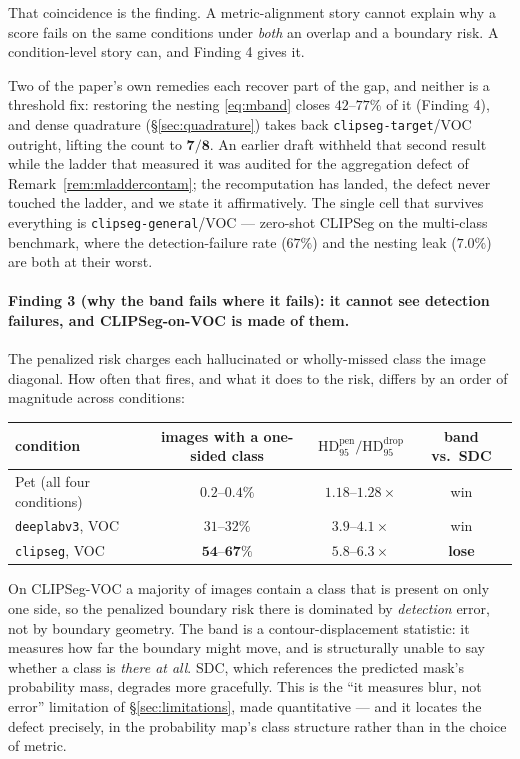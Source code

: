 \documentclass[11pt]{article}
\theoremstyle{remark}
\newcommand{\HDF}{\mathrm{HD}_{95}}
\begin{document}
That coincidence is the finding. A metric-alignment story cannot explain why a
score fails on the same conditions under \emph{both} an overlap and a boundary risk.
A condition-level story can, and Finding 4 gives it.

Two of the paper's own remedies each recover part of the gap, and neither is a
threshold fix: restoring the nesting \eqref{eq:mband} closes $42$--$77\%$ of it
(Finding 4), and dense quadrature (\S\ref{sec:quadrature}) takes back
\texttt{clipseg-target}/VOC outright, lifting the count to $\mathbf{7/8}$. An earlier
draft withheld that second result while the ladder that measured it was audited for the
aggregation defect of Remark~\ref{rem:mladdercontam}; the recomputation has landed, the
defect never touched the ladder, and we state it affirmatively. The single cell that
survives everything is
\texttt{clipseg-general}/VOC ---
zero-shot CLIPSeg on the multi-class benchmark, where the detection-failure rate
($67\%$) and the nesting leak ($7.0\%$) are both at their worst.

\paragraph{Finding 3 (why the band fails where it fails): it cannot see detection
failures, and CLIPSeg-on-VOC is made of them.} The penalized risk charges each
hallucinated or wholly-missed class the image diagonal. How often that fires, and
what it does to the risk, differs by an order of magnitude across conditions:

\begin{center}
\small
\begin{tabular}{lccc}
\toprule
condition & images with a one-sided class & $\HDF^{\mathrm{pen}} / \HDF^{\mathrm{drop}}$ & band vs.\ SDC \\
\midrule
Pet (all four conditions) & $0.2$--$0.4\%$ & $1.18$--$1.28\times$ & win \\
\texttt{deeplabv3}, VOC   & $31$--$32\%$ & $3.9$--$4.1\times$ & win \\
\texttt{clipseg}, VOC     & $\mathbf{54}$--$\mathbf{67\%}$ & $\mathbf{5.8}$--$\mathbf{6.3\times}$ & \textbf{lose} \\
\bottomrule
\end{tabular}
\end{center}

On CLIPSeg-VOC a majority of images contain a class that is present on only one
side, so the penalized boundary risk there is dominated by \emph{detection} error,
not by boundary geometry. The band is a contour-displacement statistic: it measures
how far the boundary might move, and is structurally unable to say whether a class
is \emph{there at all}. SDC, which references the predicted mask's probability mass,
degrades more gracefully. This is the ``it measures blur, not error'' limitation of
\S\ref{sec:limitations}, made quantitative --- and it locates the defect precisely,
in the probability map's class structure rather than in the choice of metric.
\end{document}
